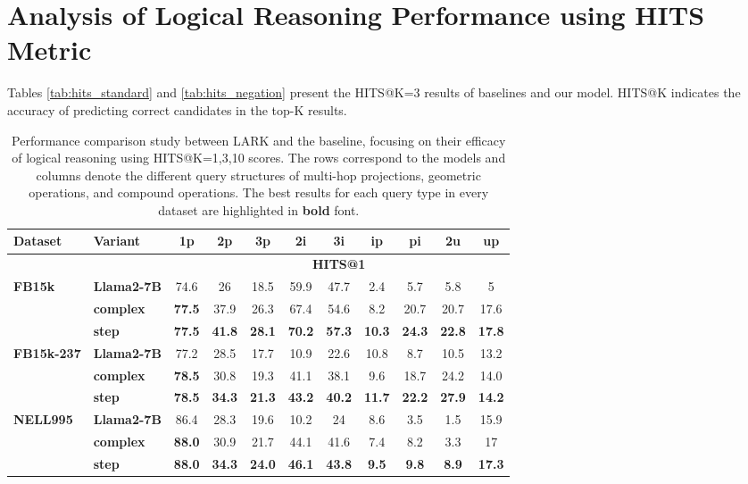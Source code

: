 \documentclass{article} %
\newcommand{\model}{LARK}
\begin{document}
{\section{Analysis of Logical Reasoning Performance using HITS Metric}
\label{app:more_results}
Tables \ref{tab:hits_standard} and \ref{tab:hits_negation} present the HITS@K=3 results of baselines and our model. HITS@K indicates the accuracy of predicting correct candidates in the top-K results.
\vspace{0.2in}

\begin{table}[htbp]
\small
\centering
\caption{Performance comparison study between {\model} and the baseline, focusing on their efficacy of logical reasoning using HITS@K=1,3,10 scores. The rows correspond to the models and columns denote the different query structures of multi-hop projections, geometric operations, and compound operations. The best results for each query type in every dataset are highlighted in \textbf{bold} font.}
\begin{tabular}{ll|ccccccccc}
\hline
\textbf{Dataset} & \textbf{Variant}   & \textbf{1p}   & \textbf{2p}   & \textbf{3p}   & \textbf{2i}   & \textbf{3i}   & \textbf{ip}   & \textbf{pi}   & \textbf{2u}   & \textbf{up}   \\
\hline
& &\multicolumn{9}{c}{\textbf{HITS@1}}\\
\hline
\textbf{FB15k} &\textbf{Llama2-7B} &74.6&26&18.5&59.9&47.7&2.4&5.7&5.8&5\\
&\textbf{complex} &\textbf{77.5}&37.9&26.3&67.4&54.6&8.2&20.7&20.7&17.6\\
&\textbf{step}&\textbf{77.5}&\textbf{41.8}&\textbf{28.1}&\textbf{70.2}&\textbf{57.3}&\textbf{10.3}&\textbf{24.3}&\textbf{22.8}&\textbf{17.8}\\
\hline
\textbf{FB15k-237} &\textbf{Llama2-7B} &77.2&28.5&17.7&10.9&22.6&10.8&8.7&10.5&13.2\\
&\textbf{complex} &\textbf{78.5}&30.8&19.3&41.1&38.1&9.6&18.7&24.2&14.0\\
&\textbf{step} &\textbf{78.5}&\textbf{34.3}&\textbf{21.3}&\textbf{43.2}&\textbf{40.2}&\textbf{11.7}&\textbf{22.2}&\textbf{27.9}&\textbf{14.2}\\
\hline
\textbf{NELL995} &\textbf{Llama2-7B} &86.4&28.3&19.6&10.2&24&8.6&3.5&1.5&15.9\\
&\textbf{complex} &\textbf{88.0}&30.9&21.7&44.1&41.6&7.4&8.2&3.3&17\\
&\textbf{step} &\textbf{88.0}&\textbf{34.3}&\textbf{24.0}&\textbf{46.1}&\textbf{43.8}&\textbf{9.5}&\textbf{9.8}&\textbf{8.9}&\textbf{17.3}\\

\end{tabular}
\end{table}}
\end{document}
